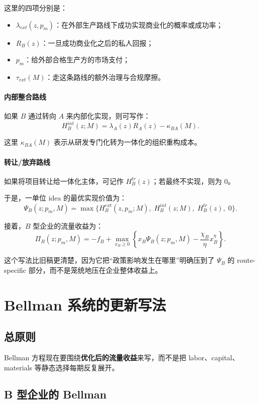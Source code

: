 \documentclass[12pt,fontset=none]{ctexart}
\begin{document}
这里的四项分别是：
\begin{itemize}
    \item $\lambda_{ext}(z,p_m)$：在外部生产路线下成功实现商业化的概率或成功率；
    \item $R_B(z)$：一旦成功商业化之后的私人回报；
    \item $p_m$：给外部合格生产方的市场支付；
    \item $\tau_{ext}(M)$：走这条路线的额外治理与合规摩擦。
\end{itemize}

\paragraph{内部整合路线}
如果 $B$ 通过转向 $A$ 来内部化实现，则可写作：
\[
H_B^{int}(z;M)=\lambda_A(z)R_A(z)-\kappa_{BA}(M).
\]

这里 $\kappa_{BA}(M)$ 表示从研发专门化转为一体化的组织重构成本。

\paragraph{转让/放弃路线}
如果将项目转让给一体化主体，可记作 $H_B^{tr}(z)$；若最终不实现，则为 $0$。

于是，一单位 idea 的最优实现价值为：
\[
\Psi_B(z;p_m,M)=\max\{H_B^{ext}(z,p_m;M),\;H_B^{int}(z;M),\;H_B^{tr}(z),\;0\}.
\]

接着，$B$ 型企业的流量收益为：
\[
\Pi_B(z;p_m,M)= -f_B+\max_{x_B\ge 0}\left\{x_B\Psi_B(z;p_m,M)-\frac{\chi_B}{\eta}x_B^{\eta}\right\}.
\]

这个写法比旧稿更清楚，因为它把“政策影响发生在哪里”明确压到了 $\Psi_B$ 的 route-specific 部分，而不是笼统地压在企业整体收益上。

\section{Bellman 系统的更新写法}

\subsection{总原则}

Bellman 方程现在要围绕\textbf{优化后的流量收益}来写，而不是把 labor、capital、materials 等静态选择每期反复展开。

\subsection{B 型企业的 Bellman}
\end{document}
